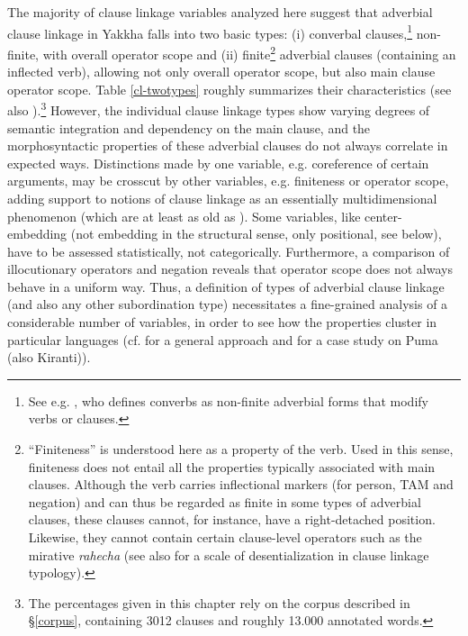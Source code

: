 The majority of clause linkage variables analyzed here  suggest that adverbial clause linkage in Yakkha falls into two basic types: (i) converbal clauses,\footnote{See e.g. \citet{Haspelmath1995The-converb}, who defines converbs as non-finite adverbial forms that modify verbs or clauses.} non-finite, with overall operator scope and (ii) finite\footnote{“Finiteness” is understood here as a property of the verb. Used in this sense, finiteness does not entail all the properties typically associated with main clauses.  Although the verb carries inflectional markers (for person, TAM and negation) and can thus be regarded as finite in some types of adverbial clauses, these clauses cannot, for instance, have a right-detached position. Likewise,  they cannot contain certain clause-level operators such as the mirative \emph{rahecha} (see also \citet[220]{Lehmann1988Towards} for a scale of desentialization in  clause linkage typology).}  adverbial clauses (containing an inflected verb), allowing not only overall operator scope, but also main clause operator scope. Table \ref{cl-twotypes} roughly summarizes their  characteristics (see also \citet{Bierkandtetal_Scope}).\footnote{The percentages given in this chapter rely on the corpus described in §\ref{corpus}, containing 3012 clauses and roughly 13.000 annotated words.} However, the individual clause linkage types show varying degrees of semantic integration and dependency on the main clause, and the morphosyntactic properties of these adverbial clauses do not always correlate in expected ways. Distinctions made by one variable, e.g. coreference of certain arguments, may be crosscut by other variables, e.g. finiteness or operator scope, adding support to notions of clause linkage as an essentially multidimensional phenomenon (which are at least as old as \citet{HaimanThompson1984_Subordination}). Some variables, like center-embedding (not embedding in the structural sense, only positional, see below), have to be assessed statistically, not categorically. Furthermore, a comparison of illocutionary operators and negation reveals that operator scope does not always behave in a uniform way. Thus, a definition of types of adverbial clause linkage (and also any other subordination type) necessitates a fine-grained ana\-lysis of a considerable number of variables, in order to see how the properties cluster in particular languages (cf. \citet{Bickel2010_Capturing} for a general approach and \citet{Schackowetal2012_Morphosyntactic} for a case study on Puma (also Kiranti)). 



